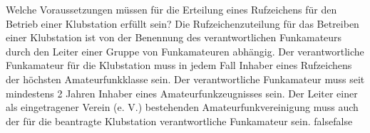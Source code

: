     {Welche Voraussetzungen müssen für die Erteilung eines Rufzeichens für den Betrieb einer Klubstation erfüllt sein?}
    {Die Rufzeichenzuteilung für das Betreiben einer Klubstation ist von der Benennung des verantwortlichen Funkamateurs durch den Leiter einer Gruppe von Funkamateuren abhängig.}
    {Der verantwortliche Funkamateur für die Klubstation muss in jedem Fall Inhaber eines Rufzeichens der höchsten Amateurfunkklasse sein.}
    {Der verantwortliche Funkamateur muss seit mindestens 2 Jahren Inhaber eines Amateurfunkzeugnisses sein.}
    {Der Leiter einer als eingetragener Verein (e. V.) bestehenden Amateurfunkvereinigung muss auch der für die beantragte Klubstation verantwortliche Funkamateur sein.}
    {false}{false}